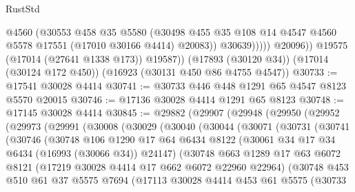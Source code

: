 \begin{lexlean}{RustStd}
\begin{coremodule}
{\begin{coremodule}
{{{{{{{{{{{{{{{{{{{{{{{{{{{{{{{{{{{{{{{{{{{{{{{{{{{{{{{                      @4560
                      (@30553
                        @458
                        @35
                        @5580
                        (@30498
                          @455
                          @35
                          @108
                          @14
                          @4547
                          @4560
                          @5578
                          @17551
                          (@17010 @30166 @4414)
                          @20083))
                      @30639)))))
            @20096))
        @19575
        (@17014 (@27641 @1338 @173))
        @19587))
    (@17893 (@30120 @34))
    (@17014 (@30124 @172 @450))
    (@16923 (@30131 @450 @86 @4755 @4547))
@30733 := @17541 @30028 @4414
@30741 := @30733 @446 @448 @1291 @65 @4547 @8123 @5570 @20015
@30746 := @17136 @30028 @4414 @1291 @65 @8123
@30748 := @17145 @30028 @4414
@30845 := @29882
    (@29907
      (@29948
        (@29950
          (@29952
            (@29973
              (@29991
                (@30008
                  (@30029
                    (@30040
                      (@30044
                        (@30071
                          (@30731
                            (@30741
                              (@30746
                                (@30748
                                  @106
                                  @1290
                                  @17
                                  @64
                                  @6434
                                  @8122
                                  (@30061 @34 @17 @34 @6434 (@16993 (@30066 @34)) @24147)
                                  (@30748
                                    @663
                                    @1289
                                    @17
                                    @63
                                    @6072
                                    @8121
                                    (@17219 @30028 @4414 @17 @662 @6072 @22960 @22964)
                                    (@30748
                                      @453
                                      @510
                                      @61
                                      @37
                                      @5575
                                      @7694
                                      (@17113
                                        @30028
                                        @4414
                                        @453
                                        @61
                                        @5575
                                        (@30733
}}}}}}}}}}}}}}}}}}}}}}}}}}}}}}}}}}}}}}}}}}}}}}}}}}}}}}}
\end{coremodule}}
\end{coremodule}
\end{lexlean}
